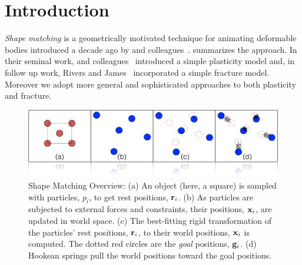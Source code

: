 \documentclass[conference]{acmsiggraph}
\begin{document}
\keywordlist

\conceptlist

\printcopyright


\copyrightspace

\section{Introduction}\label{sec:Introduction}
{\em Shape matching} is a geometrically motivated technique for animating deformable bodies introduced
a decade ago by \Mueller and colleagues~.
 summarizes the approach.
In their seminal work, \Mueller and colleagues~ introduced a simple plasticity
model and, in follow up work, Rivers and James~
incorporated a simple fracture model.    Moreover we adopt more general and sophisticated approaches to both plasticity and fracture.

\begin{figure}
\includegraphics[width=\linewidth]{Figures/shapematching.png}
\caption{Shape Matching Overview: (a) An object (here, a square) is sampled with particles, $p_i$, to get rest positions, $\mathit{\mathbf{r}}_i$.  
(b) As particles are subjected to external forces and constraints, their positions, $\mathit{\mathbf{x}}_i$, are updated in world space.  
(c)  The best-fitting rigid transformation of the particles' rest positions, $\mathit{\mathbf{r}}_i$, 
to their world positions, $\mathit{\mathbf{x}}_i$ is computed.  The dotted red circles are the {\em goal} positions, $\mathit{\mathbf{g}}_i$.  
(d) Hookean springs pull the world positions toward the goal positions.}
\label{fig:shapematching}
\end{figure}
\end{document}
